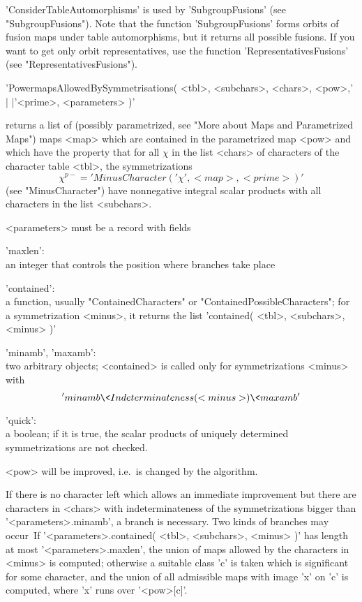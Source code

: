 'ConsiderTableAutomorphisms' is used by 'SubgroupFusions' (see
"SubgroupFusions").  Note that the function 'SubgroupFusions' forms
orbits of fusion maps under table automorphisms, but it returns all
possible fusions. If you want to get only orbit representatives, use
the function 'RepresentativesFusions' (see "RepresentativesFusions").


'PowermapsAllowedBySymmetrisations( <tbl>, <subchars>, <chars>, <pow>,'\\
|                                   |'<prime>, <parameters> )'

returns a list of (possibly parametrized, see "More about Maps and
Parametrized Maps") maps <map> which are contained in the parametrized map
<pow> and which have the property that for all $\chi$ in the list <chars> of
characters of the character table <tbl>, the symmetrizations
      \[ \chi^{p-} = 'MinusCharacter( '\chi', <map>, <prime> )' \]
(see "MinusCharacter") have nonnegative integral scalar products with all
characters in the list <subchars>.

<parameters> must be a record with fields

'maxlen':\\ an integer that controls the position where branches take place

'contained':\\ a function, usually "ContainedCharacters" or
               "ContainedPossibleCharacters"; for a symmetrization <minus>,
               it returns the list 'contained( <tbl>, <subchars>, <minus> )'

'minamb', 'maxamb':\\ two arbitrary objects; <contained> is called only for
                      symmetrizations <minus> with
                      \[ 'minamb \< Indeterminateness( <minus> ) \< maxamb' \]

'quick':\\ a boolean; if it is true, the scalar products of
           uniquely determined symmetrizations are not checked.

<pow> will be improved, i.e.\ is changed by the algorithm.

If there is no character left which allows an immediate improvement but there
are characters in <chars> with indeterminateness of the symmetrizations bigger
than '<parameters>.minamb', a branch is necessary. Two kinds of branches may
occur\:\ If '<parameters>.contained( <tbl>, <subchars>, <minus> )' has
length at most '<parameters>.maxlen', the union of maps allowed by the
characters in <minus> is computed; otherwise a suitable class 'c' is taken
which is significant for some character, and the union of all admissible maps
with image 'x' on 'c' is computed, where 'x' runs over '<pow>[c]'.

